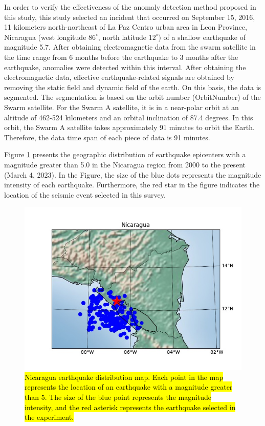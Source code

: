 \documentclass[3p,authoryear,preprint,12pt]{elsarticle}
\begin{document}
{In order to verify the effectiveness of the anomaly detection method proposed in this study, this study selected an incident that occurred on September 15, 2016, 11 kilometers north-northeast of La Paz Centro urban area in Leon Province, Nicaragua (west longitude $86^\circ$, north latitude $12^\circ$) of a shallow earthquake of magnitude 5.7. After obtaining electromagnetic data from the swarm satellite in the time range from 6 months before the earthquake to 3 months after the earthquake, anomalies were detected within this interval. After obtaining the electromagnetic data, effective earthquake-related signals are obtained by removing the static field and dynamic field of the earth. On this basis, the data is segmented. The segmentation is based on the orbit number (OrbitNumber) of the Swarm satellite. For the Swarm A satellite, it is in a near-polar orbit at an altitude of 462-524 kilometers and an orbital inclination of 87.4 degrees. In this orbit, the Swarm A satellite takes approximately 91 minutes to orbit the Earth. Therefore, the data time span of each piece of data is 91 minutes.}

Figure \ref{fig:nicaragua} presents {the geographic distribution of earthquake epicenters} with a magnitude greater than 5.0 in the Nicaragua region from 2000 to the present (March 4, 2023). In the {Figure}, the size of the blue dots represents the magnitude intensity of each earthquake. Furthermore, the red {star} in the figure indicates the location of {the seismic event selected in this survey}.
\begin{figure}[htbp]
	\centering
	\includegraphics[width=0.8\linewidth]{Nicaragua_1990-01-01-2024-01-01}
	\caption{\hl{Nicaragua earthquake distribution map. Each point in the map represents the location of an earthquake with a magnitude greater than 5. The size of the blue point represents the magnitude intensity, and the red asterisk represents the earthquake selected in the experiment.}}
	\label{fig:nicaragua}
\end{figure}
\end{document}
